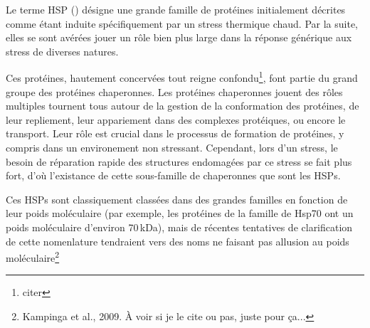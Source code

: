 \cite{federhoffmann1999, zhang2011}

Le terme HSP () désigne une grande famille de
protéines initialement décrites comme étant induite spécifiquement par un
stress thermique chaud. Par la suite, elles se sont avérées jouer un rôle bien
plus large dans la réponse générique aux stress de diverses
natures\cite{sorensen2003}.


Ces protéines, hautement concervées tout reigne confondu\footnote{citer}, font
partie du grand groupe des protéines chaperonnes. Les protéines chaperonnes
jouent des rôles multiples tournent tous autour de la gestion de la
conformation des protéines, de leur repliement, leur appariement dans des
complexes protéiques, ou encore le transport.  Leur rôle est crucial dans le
processus de formation de protéines, y compris dans un environement non
stressant. Cependant, lors d'un stress, le besoin de réparation rapide des
structures endomagées par ce stress se fait plus fort, d'où l'existance de
cette sous-famille de chaperonnes que sont les HSPs.


Ces HSPs sont classiquement classées dans des grandes familles en fonction de
leur poids moléculaire (par exemple, les protéines de la famille de Hsp70 ont
un poids moléculaire d'environ 70\,kDa), mais de récentes tentatives de
clarification de cette nomenlature tendraient vers des noms ne faisant pas
allusion au poids moléculaire\footnote{Kampinga et al., 2009. À voir si je le
cite ou pas, juste pour ça...}



